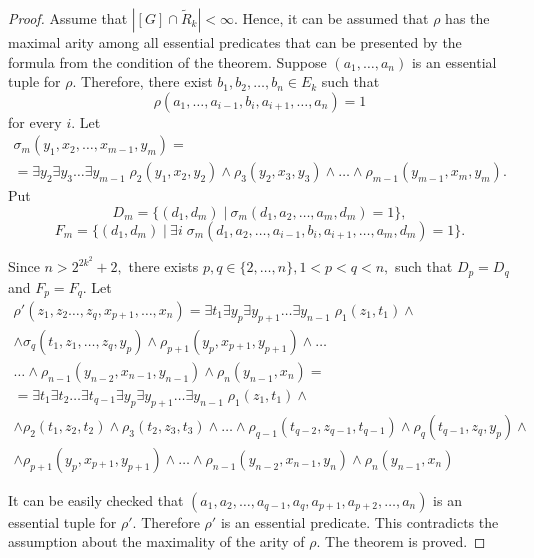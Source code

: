\documentclass{au}
\theoremstyle{plain}
\theoremstyle{definition}
\theoremstyle{remark}
\numberwithin{equation}{section}
\begin{document}
\begin{proof}

Assume that $|[G] \cap \widetilde R_{k}| < \infty.$
Hence, it can be assumed that
$\rho$ has the maximal arity among all essential predicates that can be presented by the formula
from the condition of the theorem.
Suppose $(a_{1},\ldots,a_{n})$ is an essential tuple for $\rho.$
Therefore, there exist $b_{1},b_{2},\ldots,b_{n}\in E_{k}$ such that
$$\rho(a_{1},\ldots,a_{i-1},b_{i},a_{i+1},\ldots,a_{n})=1$$ for every $i.$
Let
\begin{multline*}\sigma_{m}(y_{1},x_{2},\ldots,x_{m-1},y_{m}) = \\ =
\exists y_{2}\exists y_{3}\ldots\exists y_{m-1}\;
\rho_{2}(y_{1},x_{2},y_{2})\wedge
\rho_{3}(y_{2},x_{3},y_{3})\wedge \ldots \wedge
\rho_{m-1}(y_{m-1},x_{m},y_{m}).
\end{multline*}
Put
$$D_{m}= \{(d_{1},d_{m}) \; | \: \sigma_{m}(d_{1},a_{2},\ldots,a_{m},d_{m})=1\},$$
$$F_{m}= \{(d_{1},d_{m}) \; | \: \exists i\; \sigma_{m}(d_{1},a_{2},\ldots,a_{i-1},b_{i},a_{i+1},\ldots,a_{m},d_{m})=1\}.$$

Since $n>2^{2k^{2}}+2,$
there exists $p,q\in \{2,\ldots,n\},1<p<q<n,$
such that $D_{p}=D_{q}$ and $F_{p}=F_{q}.$
Let
\begin{multline*}
\rho'(z_{1},z_{2}\ldots,z_{q},x_{p+1},\ldots,x_{n}) =
\exists t_{1}\exists y_{p}\exists y_{p+1}\ldots\exists y_{n-1}\;
\rho_{1}(z_{1},t_{1})\wedge \\ \wedge
\sigma_{q}(t_{1},z_{1},\ldots,z_{q},y_{p}) \wedge
\rho_{p+1}(y_{p},x_{p+1},y_{p+1})\wedge \ldots \\ \ldots \wedge
\rho_{n-1}(y_{n-2},x_{n-1},y_{n-1})\wedge
\rho_{n}(y_{n-1},x_{n}) = \\
= \exists t_{1}\exists t_{2}\ldots \exists t_{q-1}\exists y_{p}\exists y_{p+1}\ldots\exists y_{n-1}\;
\rho_{1}(z_{1},t_{1})\wedge \\ \wedge
\rho_{2}(t_{1},z_{2},t_{2})\wedge
\rho_{3}(t_{2},z_{3},t_{3})\wedge \ldots \wedge
\rho_{q-1}(t_{q-2},z_{q-1},t_{q-1})\wedge
\rho_{q}(t_{q-1},z_{q},y_{p})\wedge \\ \wedge
\rho_{p+1}(y_{p},x_{p+1},y_{p+1})\wedge \ldots \wedge
\rho_{n-1}(y_{n-2},x_{n-1},y_{n})\wedge
\rho_{n}(y_{n-1},x_{n})
\end{multline*}

It can be easily checked that
$(a_{1},a_{2},\ldots,a_{q-1},a_{q}, a_{p+1},a_{p+2},\ldots,a_{n})$ is an essential tuple
for $\rho'.$ Therefore $\rho'$ is an essential predicate. This contradicts the assumption about the maximality of
the arity of $\rho.$ The theorem is proved.

\end{proof}
\end{document}
